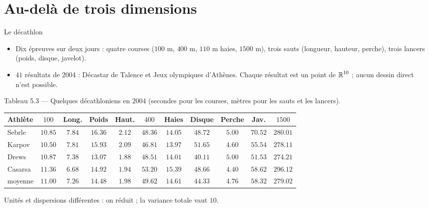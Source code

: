 \section{Au-delà de trois dimensions}

\begin{frame}{Le décathlon}
  \small
  \begin{itemize}
    \item Dix épreuves sur deux jours : quatre courses ($100$ m, $400$ m,
      $110$ m haies, $1500$ m), trois sauts (longueur, hauteur, perche),
      trois lancers (poids, disque, javelot).
    \item $41$ résultats de 2004 : Décastar de Talence et Jeux olympiques
      d'Athènes. Chaque résultat est un point de $\operatorname{\mathbb{R}}^{10}$ ; aucun dessin
      direct n'est possible.
  \end{itemize}
  \scriptsize Tableau 5.3 --- Quelques décathloniens en 2004 (secondes pour les
  courses, mètres pour les sauts et les lancers).
  \begin{center}
    \scriptsize
    \setlength{\tabcolsep}{4pt}
    \begin{tabular}{lcccccccccc}
      \toprule
      Athlète & $100$ & Long. & Poids & Haut. & $400$ & Haies & Disque & Perche & Jav. & $1500$ \\
      \midrule
      Sebrle & $\num{10.85}$ & $\num{7.84}$ & $\num{16.36}$ & $\num{2.12}$ & $\num{48.36}$ & $\num{14.05}$ & $\num{48.72}$ & $\num{5.00}$ & $\num{70.52}$ & $\num{280.01}$ \\
      Karpov & $\num{10.50}$ & $\num{7.81}$ & $\num{15.93}$ & $\num{2.09}$ & $\num{46.81}$ & $\num{13.97}$ & $\num{51.65}$ & $\num{4.60}$ & $\num{55.54}$ & $\num{278.11}$ \\
      Drews & $\num{10.87}$ & $\num{7.38}$ & $\num{13.07}$ & $\num{1.88}$ & $\num{48.51}$ & $\num{14.01}$ & $\num{40.11}$ & $\num{5.00}$ & $\num{51.53}$ & $\num{274.21}$ \\
      Casarsa & $\num{11.36}$ & $\num{6.68}$ & $\num{14.92}$ & $\num{1.94}$ & $\num{53.20}$ & $\num{15.39}$ & $\num{48.66}$ & $\num{4.40}$ & $\num{58.62}$ & $\num{296.12}$ \\
      \midrule
      moyenne & $\num{11.00}$ & $\num{7.26}$ & $\num{14.48}$ & $\num{1.98}$ & $\num{49.62}$ & $\num{14.61}$ & $\num{44.33}$ & $\num{4.76}$ & $\num{58.32}$ & $\num{279.02}$ \\
      \bottomrule
    \end{tabular}
  \end{center}
  \small Unités et dispersions différentes : on réduit ; la variance totale
  vaut $10$.
\end{frame}

